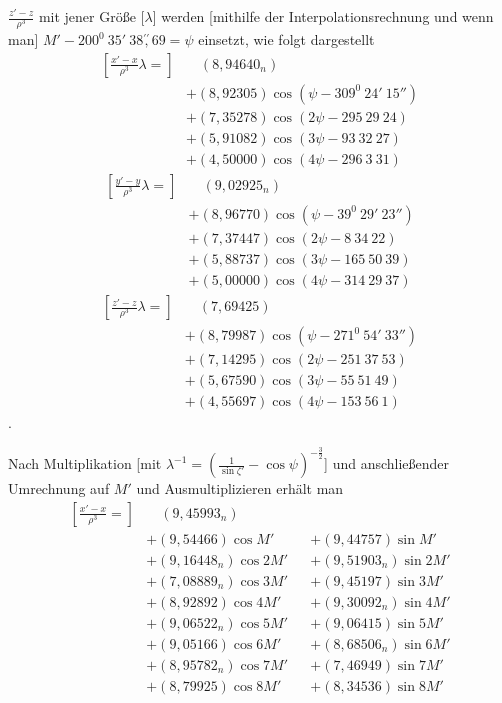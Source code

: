 \(\frac{z'-z}{\rho^3}\) mit jener Größe [\(\lambda\)] werden [mithilfe der
Interpolationsrechnung und wenn man] \(M'-200^0\ 35'\ 38\overset{\prime\prime}{,}69=\psi\)
einsetzt, wie folgt dargestellt
\[
\begin{aligned}
{\left[\frac{x'-x}{\rho^3}\lambda=\right]}&\quad(8{,}94640_n)\\
&+(8{,}92305)\cos(\psi-309^0\ 24'\ 15'')\\
&+(7{,}35278)\cos(2\psi-295\ 29\ 24)\\
&+(5{,}91082)\cos(3\psi-93\ 32\ 27)\\
&+(4{,}50000)\cos(4\psi-296\ 3\ 31)
\end{aligned}
\]
\[
\begin{aligned}
{\left[\frac{y'-y}{\rho^3}\lambda=\right]}&\quad(9{,}02925_n)\\
&+(8{,}96770)\cos(\psi-39^0\ 29'\ 23'')\\
&+(7{,}37447)\cos(2\psi-8\ 34\ 22)\\
&+(5{,}88737)\cos(3\psi-165\ 50\ 39)\\
&+(5{,}00000)\cos(4\psi-314\ 29\ 37)
\end{aligned}
\]
\[
\begin{aligned}
{\left[\frac{z'-z}{\rho^3}\lambda=\right]}&\quad(7{,}69425)\\
&+(8{,}79987)\cos(\psi-271^0\ 54'\ 33'')\\
&+(7{,}14295)\cos(2\psi-251\ 37\ 53)\\
&+(5{,}67590)\cos(3\psi-55\ 51\ 49)\\
&+(4{,}55697)\cos(4\psi-153\ 56\ 1)
\end{aligned}
\]
.
\par\noindent\hspace*{\parindent}Nach Multiplikation [mit
\(\lambda^{-1}=\left(\frac1{\sin\zeta'}-\cos\psi\right)^{-\frac32}\)] und
anschließender Umrechnung auf \(M'\) und Ausmultiplizieren erhält man
\[
\begin{aligned}
{\left[\frac{x'-x}{\rho^3}=\right]}&\quad(9{,}45993_n)\\
&+(9{,}54466)\cos M'       &&+(9{,}44757)\sin M'\\
&+(9{,}16448_n)\cos2M'    &&+(9{,}51903_n)\sin2M'\\
&+(7{,}08889_n)\cos3M'    &&+(9{,}45197)\sin3M'\\
&+(8{,}92892)\cos4M'      &&+(9{,}30092_n)\sin4M'\\
&+(9{,}06522_n)\cos5M'    &&+(9{,}06415)\sin5M'\\
&+(9{,}05166)\cos6M'      &&+(8{,}68506_n)\sin6M'\\
&+(8{,}95782_n)\cos7M'    &&+(7{,}46949)\sin7M'\\
&+(8{,}79925)\cos8M'      &&+(8{,}34536)\sin8M'
\end{aligned}
\]

